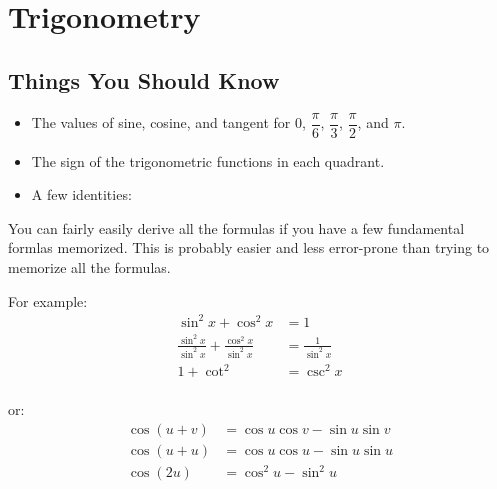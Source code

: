 \documentclass[fleqn,addpoints]{exam}
\begin{document}
\section{Trigonometry}
\subsection{Things You Should Know}
\begin{itemize}
\item The values of sine, cosine, and tangent for $0$, $\dfrac{\pi}{6}$, $\dfrac{\pi}{3}$, $\dfrac{\pi}{2}$, and $\pi$.
\item The sign of the trigonometric functions in each quadrant.
\item A few identities:
\end{itemize}

You can fairly easily derive all the formulas if you have a few fundamental formlas memorized.  This is probably easier
and less error-prone than trying to memorize all the formulas.

For example:
\begin{align*}
  \sin^2 x + \cos^2 x &= 1 \\
  \frac{\sin^2 x}{\sin^2 x} + \frac{\cos^2 x}{\sin^2 x} &= \frac{1}{\sin^2 x} \\
  1 + \cot^2 &= \csc^2 x \\
\end{align*}

or:
\begin{align*}
  \cos(u+v) &= \cos u \cos v - \sin u \sin v \\
  \cos(u+u) &= \cos u \cos u - \sin u \sin u \\
  \cos(2u) &= \cos^2 u - \sin^2 u \\
\end{align*}
\end{document}
